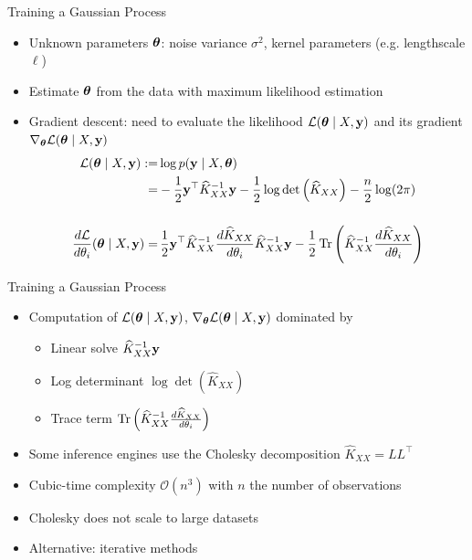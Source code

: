 \documentclass{beamer}
\begin{document}
\begin{frame}{Training a Gaussian Process}
\begin{itemize}[<+->]
    \item Unknown parameters $\boldsymbol{\mathbf{\theta}}$: noise variance $\sigma^2$, kernel parameters (e.g. lengthscale $\ell$)
    \item Estimate $\boldsymbol{\mathbf{\theta}}$ from the data with maximum likelihood estimation
    \item Gradient descent: need to evaluate the likelihood $\mathcal L(\boldsymbol{\mathbf{\theta}} \mid X, \boldsymbol{\mathbf{y}})$ and its gradient $\nabla_{\boldsymbol{\mathbf{\theta}}} \mathcal L(\boldsymbol{\mathbf{\theta}} \mid X, \boldsymbol{\mathbf{y}}) $
    \pause
    {\small \begin{align*}
        \mathcal L(\boldsymbol{\mathbf{\theta}} \mid X, \boldsymbol{\mathbf{y}}) 
    :=& \log p(\boldsymbol{\mathbf{y}} \mid X, \boldsymbol{\mathbf{\theta}}) \nonumber\\
    =& - \frac 1 2 \boldsymbol{\mathbf{y}}^\top \widehat K_{XX}^{-1} \boldsymbol{\mathbf{y}} - \frac 1 2 \log \det \left( \widehat K_{XX} \right) - \frac n 2 \log(2\pi) \label{eq:marginal_log_likelihood}\\[0.5cm]
    \frac{d \mathcal L}{d \theta_i} (\boldsymbol{\mathbf{\theta}} \mid X, \boldsymbol{\mathbf{y}}) 
    =& \, \frac 1 2 \boldsymbol{\mathbf{y}}^\top \widehat K_{XX}^{-1} \frac{d \widehat K_{XX}}{d\theta_i} \widehat K_{XX}^{-1} \boldsymbol{\mathbf{y}} - \frac 1 2 \operatorname{Tr} \left( \widehat K_{XX}^{-1} \frac{d \widehat K_{XX}}{d\theta_i} \right)
    \end{align*}}
\end{itemize}
\end{frame}

\begin{frame}{Training a Gaussian Process}
\begin{itemize}[<+->]
    \item Computation of $\mathcal L(\boldsymbol{\mathbf{\theta}} \mid X, \boldsymbol{\mathbf{y}})$,  $\nabla_{\boldsymbol{\mathbf{\theta}}} \mathcal L(\boldsymbol{\mathbf{\theta}} \mid X, \boldsymbol{\mathbf{y}}) $ dominated by 
    \begin{itemize}
        \item Linear solve $\widehat K_{XX}^{-1} \boldsymbol{\mathbf{y}}$
        \item Log determinant $\log \det \left( \widehat K_{XX} \right)$
        \item Trace term $\operatorname{Tr} \left( \widehat K_{XX}^{-1} \frac{d \widehat K_{XX}}{d\theta_i} \right)$
    \end{itemize}
    \item Some inference engines use the Cholesky decomposition $\widehat K_{XX} = L L^\top$
    \item Cubic-time complexity $\mathcal O(n^3)$ with $n$ the number of observations
    \item Cholesky does not scale to large datasets
    \item Alternative: iterative methods 
\end{itemize}
\end{frame}
\end{document}
